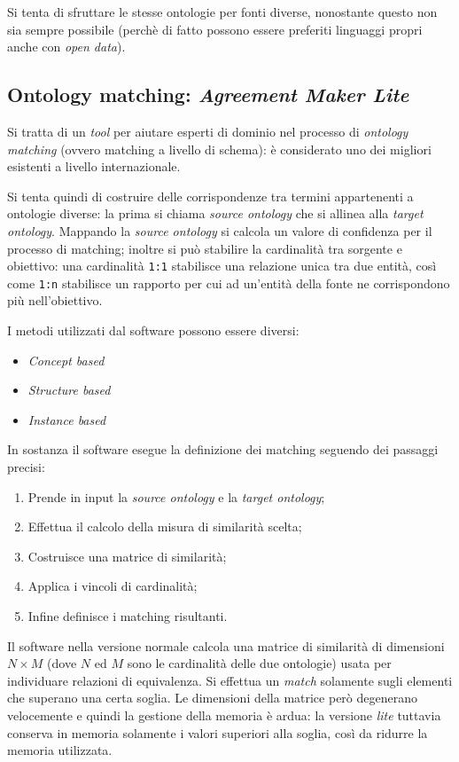 \documentclass[11pt]{article}
\begin{document}
Si tenta di sfruttare le stesse ontologie per fonti diverse, nonostante questo non sia sempre possibile (perchè di fatto possono essere preferiti linguaggi propri anche con \textit{open data}).

\subsection{Ontology matching: \textit{Agreement Maker Lite}}
Si tratta di un \textit{tool} per aiutare esperti di dominio nel processo di \textit{ontology matching} (ovvero matching a livello di schema): è considerato uno dei migliori esistenti a livello internazionale.

Si tenta quindi di costruire delle corrispondenze tra termini appartenenti a ontologie diverse: la prima si chiama \textit{source ontology} che si allinea alla \textit{target ontology}.
Mappando la \textit{source ontology} si calcola un valore di confidenza per il processo di matching; inoltre si può stabilire la cardinalità tra sorgente e obiettivo: una cardinalità \verb|1:1| stabilisce una relazione unica tra due entità, così come \verb|1:n| stabilisce un rapporto per cui ad un'entità della fonte ne corrispondono più nell'obiettivo.

I metodi utilizzati dal software possono essere diversi:
\begin{itemize}
\item \textit{Concept based}
\item \textit{Structure based}
\item \textit{Instance based}
\end{itemize}
In sostanza il software esegue la definizione dei matching seguendo dei passaggi precisi:
\begin{enumerate}
\item Prende in input la \textit{source ontology} e la \textit{target ontology};
\item Effettua il calcolo della misura di similarità scelta;
\item Costruisce una matrice di similarità;
\item Applica i vincoli di cardinalità;
\item Infine definisce i matching risultanti.
\end{enumerate}
Il software nella versione normale calcola una matrice di similarità di dimensioni $N \times M$ (dove $N$ ed $M$ sono le cardinalità delle due ontologie) usata per individuare relazioni di equivalenza.
Si effettua un \textit{match} solamente sugli elementi che superano una certa soglia.
Le dimensioni della matrice però degenerano velocemente e quindi la gestione della memoria è ardua: la versione \textit{lite} tuttavia conserva in memoria solamente i valori superiori alla soglia, così da ridurre la memoria utilizzata.
\end{document}
